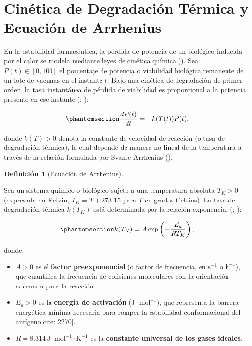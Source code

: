 \documentclass[
  spanish,
  letterpaper,
  DIV=11,
  numbers=noendperiod]{scrreprt}
\providecommand{\tightlist}{%
  \setlength{\itemsep}{0pt}\setlength{\parskip}{0pt}}
\theoremstyle{plain}
\theoremstyle{plain}
\theoremstyle{plain}
\theoremstyle{definition}
\newtheorem{definition}{Definición}[chapter]
\theoremstyle{remark}
\begin{document}
\section{Cinética de Degradación Térmica y Ecuación de
Arrhenius}\label{sec-fundamento-arrhenius}

En la estabilidad farmacéutica, la pérdida de potencia de un biológico
inducida por el calor se modela mediante leyes de cinética química
(). Sea
\(P(t) \in [0, 100]\) el porcentaje de potencia o viabilidad biológica
remanente de un lote de vacunas en el instante \(t\). Bajo una cinética
de degradación de primer orden, la tasa instantánea de pérdida de
viabilidad es proporcional a la potencia presente en ese instante
(;
):

\begin{equation}\phantomsection\label{eq-cinetica-primer-orden}{
\frac{dP(t)}{dt} = -k(T(t)) P(t),
}\end{equation}

donde \(k(T) > 0\) denota la constante de velocidad de reacción (o tasa
de degradación térmica), la cual depende de manera no lineal de la
temperatura a través de la relación formulada por Svante Arrhenius
().

\begin{definition}[Ecuación de
Arrhenius]\protect\hypertarget{def-ecuacion-arrhenius}{}\label{def-ecuacion-arrhenius}

Sea un sistema químico o biológico sujeto a una temperatura absoluta
\(T_K > 0\) (expresada en Kelvin, \(T_K = T + 273.15\) para \(T\) en
grados Celsius). La tasa de degradación térmica \(k(T_K)\) está
determinada por la relación exponencial
(;
):

\begin{equation}\phantomsection\label{eq-arrhenius-teorica}{
k(T_K) = A \exp\left( -\frac{E_a}{R T_K} \right),
}\end{equation}

donde:

\begin{itemize}
\tightlist
\item
  \(A > 0\) es el \textbf{factor preexponencial} (o factor de
  frecuencia, en \(\text{s}^{-1}\) o \(\text{h}^{-1}\)), que cuantifica
  la frecuencia de colisiones moleculares con la orientación adecuada
  para la reacción.
\item
  \(E_a > 0\) es la \textbf{energía de activación}
  (\(\text{J}\cdot\text{mol}^{-1}\)), que representa la barrera
  energética mínima necesaria para romper la estabilidad conformacional
  del antígeno{[}cite: 2270{]}.
\item
  \(R = 8.314\,\text{J}\cdot\text{mol}^{-1}\cdot\text{K}^{-1}\) es la
  \textbf{constante universal de los gases ideales}.
\end{itemize}

\end{definition}
\end{document}
